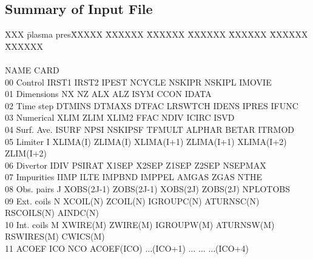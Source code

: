 \subsection{Summary of Input File}
\renewcommand{\baselinestretch}{0.56} \large \normalsize
\begin{tabbing}
XXX \= plasma pres\= XXXXX \= XXXXXX \= XXXXXX \= XXXXXX \= XXXXXX \= XXXXXX \= XXXXXX \kill
 \>         \\
  \\
NAME CARD\\
\tiny 00 \> \tiny Control \> \tiny IRST1 \>\tiny IRST2 \>\tiny IPEST
\>\tiny NCYCLE \>\tiny  NSKIPR \>\tiny NSKIPL \> \tiny IMOVIE\\
\tiny 01 \> \tiny Dimensions \> \tiny NX \>\tiny NZ \>\tiny ALX
\>\tiny ALZ \>\tiny ISYM \>\tiny CCON \>\tiny IDATA \\
\tiny 02 \> \tiny Time step \> \tiny DTMINS \>\tiny DTMAXS \>\tiny
DTFAC \>\tiny LRSWTCH \>\tiny IDENS \>\tiny IPRES \>\tiny IFUNC
\\
\tiny 03 \> \tiny Numerical \> \tiny XLIM \>\tiny ZLIM \>\tiny
XLIM2 \>\tiny FFAC \>\tiny NDIV \>\tiny ICIRC \>\tiny ISVD \\
\tiny04 \> \tiny Surf. Ave. \> \tiny ISURF \>\tiny NPSI \>\tiny
NSKIPSF \>\tiny TFMULT \>\tiny  ALPHAR \>\tiny BETAR \>\tiny
ITRMOD \\
\tiny 05 \> \tiny Limiter \> \tiny I \>\tiny XLIMA(I) \>\tiny ZLIMA(I)
\>\tiny XLIMA(I+1) \>\tiny ZLIMA(I+1) \>\tiny XLIMA(I+2) \>\tiny
ZLIM(I+2) \\
\tiny 06 \> \tiny Divertor \> \tiny IDIV \>\tiny PSIRAT \>\tiny X1SEP
\>\tiny X2SEP \>\tiny Z1SEP \>\tiny Z2SEP \>\tiny NSEPMAX \\
\tiny 07 \> \tiny Impurities \> \tiny IIMP \>\tiny ILTE \>\tiny
IMPBND \>\tiny IMPPEL \>\tiny AMGAS \>\tiny ZGAS \>\tiny NTHE\\
\tiny 08 \> \tiny Obs. pairs \> \tiny J \>\tiny XOBS(2J-1) \>\tiny
ZOBS(2J-1) \>\tiny XOBS(2J) \>\tiny ZOBS(2J) \> \tiny NPLOTOBS \\
\tiny 09 \> \tiny Ext. coils \> \tiny N \>\tiny XCOIL(N) \>\tiny
ZCOIL(N) \>\tiny IGROUPC(N) \>\tiny ATURNSC(N) \>\tiny RSCOILS(N)
\>\tiny AINDC(N) \\
\tiny 10 \> \tiny Int. coils \> \tiny M \>\tiny XWIRE(M) \>\tiny
ZWIRE(M) \>\tiny IGROUPW(M) \>\tiny ATURNSW(M) \>\tiny RSWIRES(M)
\>\tiny CWICS(M) \\
\tiny 11 \> \tiny ACOEF  \> \tiny ICO \>\tiny NCO \>\tiny
ACOEF(ICO) \>\tiny $\ldots$(ICO+1) \> $\ldots$ \> $\ldots$ \> \tiny $\ldots$(ICO+4)

\end{tabbing}
